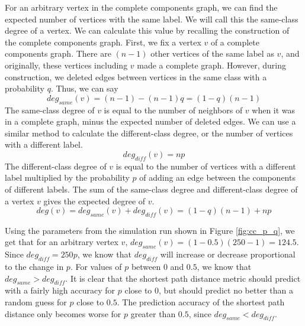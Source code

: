 For an arbitrary vertex in the complete components graph, we can find the expected number of vertices with the same label. We will call this the same-class degree of a vertex. We can calculate this value by recalling the construction of the complete components graph. First, we fix a vertex $v$ of a complete components graph. There are $(n-1)$ other vertices of the same label as $v$, and originally, these vertices including $v$ made a complete graph. However, during construction, we deleted edges between vertices in the same class with a probability $q$. Thus, we can say
$$deg_{same}(v) = (n-1) - (n-1)q = (1-q)(n-1)$$
The same-class degree of $v$ is equal to the number of neighbors of $v$ when it was in a complete graph, minus the expected number of deleted edges. We can use a similar method to calculate the different-class degree, or the number of vertices with a different label.
$$deg_{diff}(v) = np$$
The different-class degree of $v$ is equal to the number of vertices with a different label multiplied by the probability $p$ of adding an edge between the components of different labels. The sum of the same-class degree and different-class degree of a vertex $v$ gives the expected degree of $v$.
$$deg(v) = deg_{same}(v) + deg_{diff}(v) = (1-q)(n-1) + np$$

Using the parameters from the simulation run shown in Figure \ref{fig:cc_p_q}, we get that for an arbitrary vertex $v$, $deg_{same}(v) = (1-0.5)(250-1) = 124.5$. Since $deg_{diff} = 250p$, we know that $deg_{diff}$ will increase or decrease proportional to the change in $p$. For values of $p$ between $0$ and $0.5$, we know that $deg_{same} > deg_{diff}$. It is clear that the shortest path distance metric should predict with a fairly high accuracy for $p$ close to $0$, but should predict no better than a random guess for $p$ close to $0.5$. The prediction accuracy of the shortest path distance only becomes worse for $p$ greater than $0.5$, since $deg_{same} < deg_{diff}$.